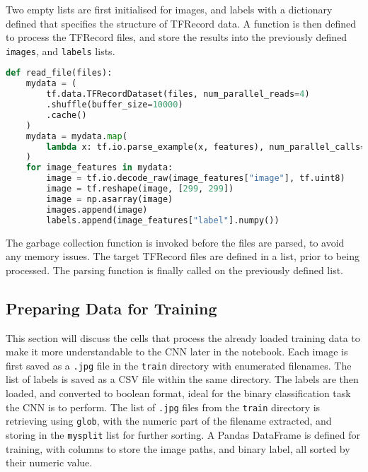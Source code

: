 \documentclass[../main]{subfiles}
\begin{document}
Two empty lists are first initialised for images, and labels with a dictionary
defined that specifies the structure of TFRecord data. A function is then
defined to process the TFRecord files, and store the results into the
previously defined \texttt{images}, and \texttt{labels} lists. 

\begin{lstlisting}[language=Python, caption=Python example]
def read_file(files):
    mydata = (
        tf.data.TFRecordDataset(files, num_parallel_reads=4)
        .shuffle(buffer_size=10000)
        .cache()
    )
    mydata = mydata.map(
        lambda x: tf.io.parse_example(x, features), num_parallel_calls=4
    )
    for image_features in mydata:
        image = tf.io.decode_raw(image_features["image"], tf.uint8)
        image = tf.reshape(image, [299, 299])
        image = np.asarray(image)
        images.append(image)
        labels.append(image_features["label"].numpy())
\end{lstlisting}

The garbage collection function is invoked before the files are parsed, to
avoid any memory issues. The target TFRecord files are defined in a list, prior
to being processed. The parsing function is finally called on the previously
defined list.

\subsection{Preparing Data for Training}
This section will discuss the cells that process the already loaded training
data to make it more understandable to the CNN later in the notebook. Each
image is first saved as a \texttt{.jpg} file in the \texttt{train} directory
with enumerated filenames. The list of labels is saved as a CSV file within the
same directory. The labels are then loaded, and converted to boolean format,
ideal for the binary classification task the CNN is to perform. The list of
\texttt{.jpg} files from the \texttt{train} directory is retrieving using
\texttt{glob}, with the numeric part of the filename extracted, and storing in
the \texttt{mysplit} list for further sorting. A Pandas DataFrame is defined
for training, with columns to store the image paths, and binary label, all
sorted by their numeric value.
\end{document}
